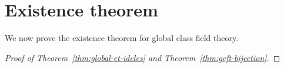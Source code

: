 \section{Existence theorem}
We now prove the existence theorem for global class field theory.
\begin{proof}[Proof of Theorem~\ref{thm:global-et-ideles} and Theorem~\ref{thm:gcft-bijection}]
%

\end{proof}
